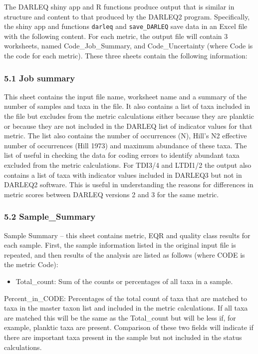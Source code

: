 \documentclass[]{article}
\providecommand{\tightlist}{%
  \setlength{\itemsep}{0pt}\setlength{\parskip}{0pt}}
\begin{document}
The DARLEQ shiny app and R functions produce output that is similar in
structure and content to that produced by the DARLEQ2 program.
Specifically, the shiny app and functions \texttt{darleq} and
\texttt{save\_DARLEQ} save data in an Excel file with the following
content. For each metric, the output file will contain 3 worksheets,
named Code\_Job\_Summary, and Code\_Uncertainty (where Code is the code
for each metric). These three sheets contain the following information:

\subsubsection{5.1 Job summary}\label{job-summary}

This sheet contains the input file name, worksheet name and a summary of
the number of samples and taxa in the file. It also contains a list of
taxa included in the file but excludes from the metric calculations
either because they are planktic or because they are not included in the
DARLEQ list of indicator values for that metric. The list also contains
the number of occurrences (N), Hill's N2 effective number of occurrences
(Hill 1973) and maximum abundance of these taxa. The list of useful in
checking the data for coding errors to identify abundant taxa excluded
from the metric calculations. For TDI3/4 and LTDI1/2 the output also
contains a list of taxa with indicator values included in DARLEQ3 but
not in DARLEQ2 software. This is useful in understanding the reasons for
differences in metric scores between DARLEQ versions 2 and 3 for the
same metric.

\subsubsection{5.2 Sample\_Summary}\label{sample_summary}

Sample Summary -- this sheet contains metric, EQR and quality class
results for each sample. First, the sample information listed in the
original input file is repeated, and then results of the analysis are
listed as follows (where CODE is the metric Code):

\begin{itemize}
\tightlist
\item
  Total\_count: Sum of the counts or percentages of all taxa in a
  sample.
\end{itemize}

Percent\_in\_CODE: Percentages of the total count of taxa that are
matched to taxa in the master taxon list and included in the metric
calculations. If all taxa are matched this will be the same as the
Total\_count but will be less if, for example, planktic taxa are
present. Comparison of these two fields will indicate if there are
important taxa present in the sample but not included in the status
calculations.
\end{document}
